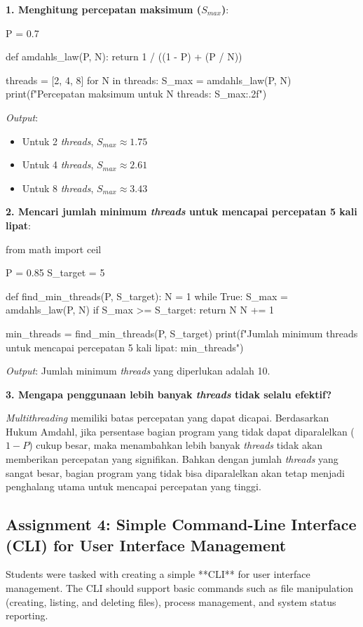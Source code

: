 \documentclass[12pt]{article}
\begin{document}
\textbf{1. Menghitung percepatan maksimum (\(S_{max}\))}:

\begin{python}
P = 0.7

def amdahls_law(P, N):
    return 1 / ((1 - P) + (P / N))

threads = [2, 4, 8]
for N in threads:
    S_max = amdahls_law(P, N)
    print(f"Percepatan maksimum untuk {N} threads: {S_max:.2f}")
\end{python}
\textit{Output}:
\begin{itemize}
    \item Untuk 2 \textit{threads}, \(S_{max} \approx 1.75\)
    \item Untuk 4 \textit{threads}, \(S_{max} \approx 2.61\)
    \item Untuk 8 \textit{threads}, \(S_{max} \approx 3.43\)
\end{itemize}

\textbf{2. Mencari jumlah minimum \textit{threads} untuk mencapai percepatan 5 kali lipat}:

\begin{python}
from math import ceil

P = 0.85
S_target = 5

def find_min_threads(P, S_target):
    N = 1
    while True:
        S_max = amdahls_law(P, N)
        if S_max >= S_target:
            return N
        N += 1

min_threads = find_min_threads(P, S_target)
print(f"Jumlah minimum threads untuk mencapai percepatan 5 kali lipat: {min_threads}")
\end{python}
\textit{Output}: Jumlah minimum \textit{threads} yang diperlukan adalah 10.

\textbf{3. Mengapa penggunaan lebih banyak \textit{threads} tidak selalu efektif?}

\textit{Multithreading} memiliki batas percepatan yang dapat dicapai. Berdasarkan Hukum Amdahl, jika persentase bagian program yang tidak dapat diparalelkan (\(1 - P\)) cukup besar, maka menambahkan lebih banyak \textit{threads} tidak akan memberikan percepatan yang signifikan. Bahkan dengan jumlah \textit{threads} yang sangat besar, bagian program yang tidak bisa diparalelkan akan tetap menjadi penghalang utama untuk mencapai percepatan yang tinggi.

\subsection{Assignment 4: Simple Command-Line Interface (CLI) for User Interface Management}
Students were tasked with creating a simple **CLI** for user interface management. The CLI should support basic commands such as file manipulation (creating, listing, and deleting files), process management, and system status reporting.
\end{document}
